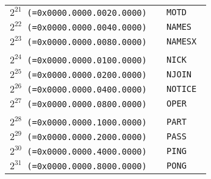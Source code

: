 \documentclass[documentation]{subfiles}
\begin{document}
\begin{minipage}{.48\textwidth}
\begin{longtable}{>{\tt}r>{\tt}l}
        $2^{21}$ (=0x0000.0000.0020.0000) & MOTD         \\
        $2^{22}$ (=0x0000.0000.0040.0000) & NAMES        \\
        $2^{23}$ (=0x0000.0000.0080.0000) & NAMESX       \\
        \\
        $2^{24}$ (=0x0000.0000.0100.0000) & NICK         \\
        $2^{25}$ (=0x0000.0000.0200.0000) & NJOIN        \\
        $2^{26}$ (=0x0000.0000.0400.0000) & NOTICE       \\
        $2^{27}$ (=0x0000.0000.0800.0000) & OPER         \\
        \\
        $2^{28}$ (=0x0000.0000.1000.0000) & PART         \\
        $2^{29}$ (=0x0000.0000.2000.0000) & PASS         \\
        $2^{30}$ (=0x0000.0000.4000.0000) & PING         \\
        $2^{31}$ (=0x0000.0000.8000.0000) & PONG         \\
        \bottomrule
    \end{longtable}
\end{minipage}
\hfill
\end{document}
